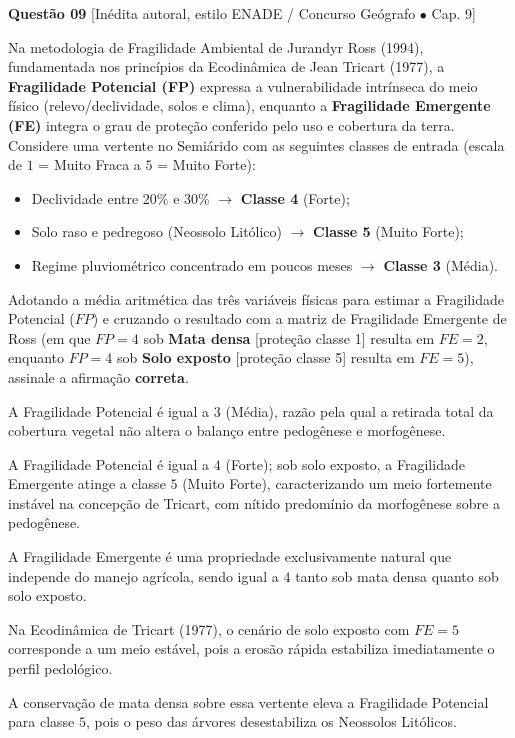 \vspace{6pt}
\noindent\textbf{Questão 09} {\footnotesize\color{uefsMuted}[Inédita autoral, estilo ENADE / Concurso Geógrafo $\bullet$ Cap. 9]}\par
Na metodologia de Fragilidade Ambiental de Jurandyr Ross (1994), fundamentada nos princípios da Ecodinâmica de Jean Tricart (1977), a \textbf{Fragilidade Potencial (FP)} expressa a vulnerabilidade intrínseca do meio físico (relevo/declividade, solos e clima), enquanto a \textbf{Fragilidade Emergente (FE)} integra o grau de proteção conferido pelo uso e cobertura da terra. Considere uma vertente no Semiárido com as seguintes classes de entrada (escala de $1$ = Muito Fraca a $5$ = Muito Forte):
\begin{itemize}[leftmargin=1.8em, itemsep=1.5pt, topsep=3pt]
  \item Declividade entre $20\%$ e $30\%$ $\to$ \textbf{Classe 4} (Forte);
  \item Solo raso e pedregoso (Neossolo Litólico) $\to$ \textbf{Classe 5} (Muito Forte);
  \item Regime pluviométrico concentrado em poucos meses $\to$ \textbf{Classe 3} (Média).
\end{itemize}
Adotando a média aritmética das três variáveis físicas para estimar a Fragilidade Potencial ($FP$) e cruzando o resultado com a matriz de Fragilidade Emergente de Ross (em que $FP = 4$ sob \textbf{Mata densa} [proteção classe 1] resulta em $FE = 2$, enquanto $FP = 4$ sob \textbf{Solo exposto} [proteção classe 5] resulta em $FE = 5$), assinale a afirmação \textbf{correta}.
\begin{alternativas}
  \item A Fragilidade Potencial é igual a $3$ (Média), razão pela qual a retirada total da cobertura vegetal não altera o balanço entre pedogênese e morfogênese.
  \item A Fragilidade Potencial é igual a $4$ (Forte); sob solo exposto, a Fragilidade Emergente atinge a classe $5$ (Muito Forte), caracterizando um meio fortemente instável na concepção de Tricart, com nítido predomínio da morfogênese sobre a pedogênese.
  \item A Fragilidade Emergente é uma propriedade exclusivamente natural que independe do manejo agrícola, sendo igual a $4$ tanto sob mata densa quanto sob solo exposto.
  \item Na Ecodinâmica de Tricart (1977), o cenário de solo exposto com $FE = 5$ corresponde a um meio estável, pois a erosão rápida estabiliza imediatamente o perfil pedológico.
  \item A conservação de mata densa sobre essa vertente eleva a Fragilidade Potencial para classe $5$, pois o peso das árvores desestabiliza os Neossolos Litólicos.
\end{alternativas}

